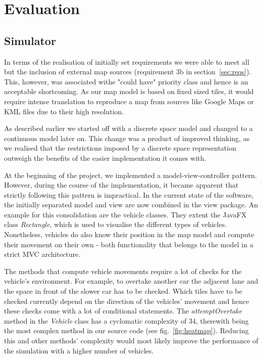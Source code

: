 \section{Evaluation}
\subsection{Simulator}\label{ss:eval_sim}
In terms of the realisation of initially set requirements we were able to meet all but the inclusion of external map sources (requirement 3b in section~\ref{sec:reqs}). This, however, was associated withe "could have" priority class and hence is an acceptable shortcoming. As our map model is based on fixed sized tiles, it would require intense translation to reproduce a map from sources like Google Maps or KML files due to their high resolution. 

As described earlier we started off with a discrete space model and changed to a continuous model later on. This change was a product of improved thinking, as we realised that the restrictions imposed by a discrete space representation outweigh the benefits of the easier implementation it comes with.

At the beginning of the project, we implemented a model-view-controller pattern. However, during the course of the implementation, it became apparent that strictly following this pattern is impractical. In the current state of the software, the initially separated model and view are now combined in the view package. An example for this consolidation are the vehicle classes. They extent the JavaFX class \textit{Rectangle}, which is used to visualise the different types of vehicles. Nonetheless, vehicles do also know their position in the map model and compute their movement on their own - both functionality that belongs to the model in a strict MVC architecture.

The methods that compute vehicle movements require a lot of checks for the vehicle's environment. For example, to overtake another car the adjacent lane and the space in front of the slower car has to be checked. Which tiles have to be checked currently depend on the direction of the vehicles' movement and hence these checks come with a lot of conditional statements. The \textit{attemptOvertake} method in the \textit{Vehicle} class has a cyclomatic complexity of 34, therewith being the most complex method in our source code (see fig.~\ref{fig:heatmap}). Reducing this and other methods' complexity would most likely improve the performance of the simulation with a higher number of vehicles. 

